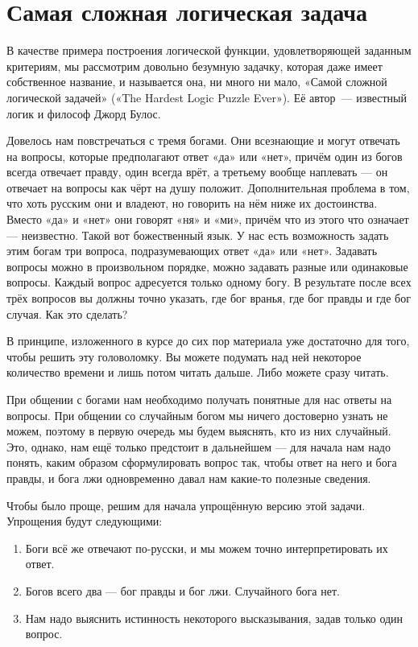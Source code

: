 \section{Самая сложная логическая задача}

В качестве примера построения логической функции, удовлетворяющей заданным критериям, мы рассмотрим довольно безумную задачку, которая даже имеет собственное название, и называется она, ни много ни мало, «Самой сложной логической задачей» («The Hardest Logic Puzzle Ever»). Её автор~— известный логик и философ Джорд Булос.

\begin{problem}
Довелось нам повстречаться с тремя богами. Они всезнающие и могут отвечать на вопросы, которые предполагают ответ «да» или «нет», причём один из богов всегда отвечает правду, один всегда врёт, а третьему вообще наплевать — он отвечает на вопросы как чёрт на душу положит. Дополнительная проблема в том, что хоть русским они и владеют, но говорить на нём ниже их достоинства. Вместо «да» и «нет» они говорят «ня» и «ми», причём что из этого что означает — неизвестно. Такой вот божественный язык. У нас есть возможность задать этим богам три вопроса, подразумевающих ответ «да» или «нет». Задавать вопросы можно в произвольном порядке, можно задавать разные или одинаковые вопросы. Каждый вопрос адресуется только одному богу. В результате после всех трёх вопросов вы должны точно указать, где бог вранья, где бог правды и где бог случая. Как это сделать?
\end{problem}

В принципе, изложенного в курсе до сих пор материала уже достаточно для того, чтобы решить эту головоломку. Вы можете подумать над ней некоторое количество времени и лишь потом читать дальше. Либо можете сразу читать.

При общении с богами нам необходимо получать понятные для нас ответы на вопросы. При общении со случайным богом мы ничего достоверно узнать не можем, поэтому в первую очередь мы будем выяснять, кто из них случайный. Это, однако, нам ещё только предстоит в дальнейшем — для начала нам надо понять, каким образом сформулировать вопрос так, чтобы ответ на него и бога правды, и бога лжи одновременно давал нам какие-то полезные сведения.

Чтобы было проще, решим для начала упрощённую версию этой задачи. Упрощения будут следующими:

\begin{enumerate}
\item Боги всё же отвечают по-русски, и мы можем точно интерпретировать их ответ.
\item Богов всего два — бог правды и бог лжи. Случайного бога нет.
\item Нам надо выяснить истинность некоторого высказывания, задав только один вопрос.
\end{enumerate}

